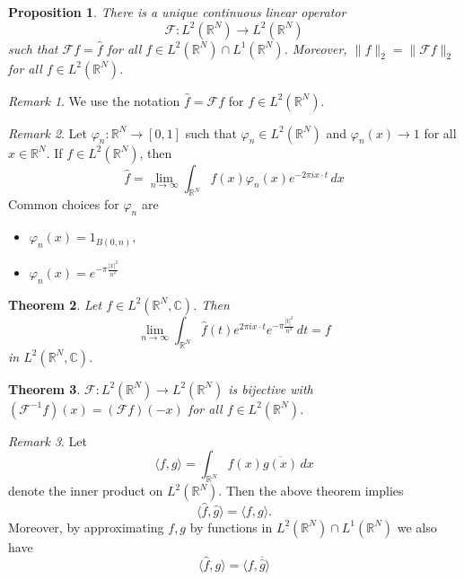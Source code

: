\documentclass[10pt, oneside, reqno]{amsart}
\theoremstyle{plain}%
\newtheorem{thm}{Theorem}[section]
\newtheorem{prop}[thm]{Proposition}
\theoremstyle{definition}
\theoremstyle{remark}
\newtheorem*{rem}{Remark}
\newcommand{\R}{\mathbb{R}}
\newcommand{\Com}{\mathbb{C}}
\renewcommand{\phi}{\varphi}
\begin{document}
\begin{prop}
    There is a unique continuous linear operator \[
        \mathcal{F} : L^2(\R^N) \rightarrow L^2(\R^N)
    \] such that $\mathcal{F} f = \hat f$ for all $f \in L^2(\R^N) \cap L^1(\R^N)$.  Moreover, $\| f \|_2 = \| \mathcal{F} f \|_2$ for all $f \in L^2(\R^N)$.
\end{prop}

\begin{rem}
    We use the notation $\hat f = \mathcal{F} f$ for $f \in L^2(\R^N)$.  
\end{rem}
\begin{rem}
    Let $\phi_n : \R^N \rightarrow [0,1]$ such that $\phi_n \in L^2(\R^N)$ and $\phi_n(x) \rightarrow 1$ for all $x \in \R^N$. If $f \in L^2(\R^N)$, then \[
        \hat f = \lim_{n \rightarrow \infty} \int_{\R^N} f(x) \phi_n(x) e^{-2 \pi i x \cdot t} \, dx
    \]
    Common choices for $\phi_n$ are 
    \begin{itemize}
        \item $\phi_n(x) = 1_{B(0,n)},$
        \item $\phi_n(x) = e^{- \pi \frac{|x|^2}{n^2}}$
    \end{itemize}
\end{rem}

\begin{thm}
    Let $f \in L^2(\R^N, \Com)$.  Then \[
        \lim_{n \rightarrow \infty} \int_{\R^N} \hat f (t) e^{2 \pi i x \cdot t} e^{- \pi \frac{|t|^2}{n^2}} \, dt = f
    \] in $L^2(\R^N, \Com)$.
\end{thm}

\begin{thm}
    $\mathcal{F} : L^2(\R^N) \rightarrow L^2(\R^N)$ is bijective with $(\mathcal{F}^{-1} f) (x) = (\mathcal{F} f) (-x)$ for all $f \in L^2(\R^N)
$.
\end{thm}


\begin{rem}
    Let \[
        \langle f, g \rangle = \int_{\R^N} f(x) \overline{g(x)} \, dx
    \] denote the inner product on $L^2(\R^N)$.  Then the above theorem implies \[
        \langle \hat f, \hat g \rangle = \langle f, g \rangle.
    \]
    Moreover, by approximating $f,g$ by functions in $L^2(\R^N) \cap L^1(\R^N)$ we also have \[
        \langle \hat f, g \rangle = \langle f, \overline{\hat g} \rangle
    \]
\end{rem}

\end{document}
